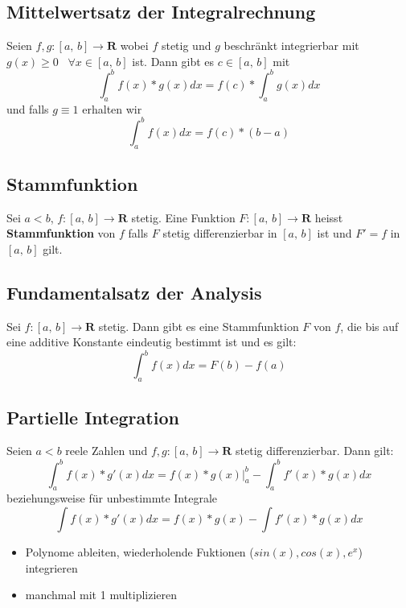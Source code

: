 \documentclass[8pt]{article}
\begin{document}
\begin{multicols*}{3}
\subsection{Mittelwertsatz der Integralrechnung}

Seien $f,g:[a,\,b] \rightarrow \mathbf{R}$ wobei $f$ stetig und $g$ beschränkt integrierbar mit $g(x) \geq 0 \;\;\; \forall x \in [a,\,b]$ ist.
Dann gibt es $c \in [a,\,b]$ mit $$\int_a^b f(x) * g(x) dx = f(c) * \int_a^b g(x) dx$$
und falls $g \equiv 1$ erhalten wir $$\int_a^b f(x) dx = f(c) * (b - a)$$

\subsection{Stammfunktion}

Sei $a < b$, $f:[a,\,b] \rightarrow \mathbf{R}$ stetig. Eine Funktion $F:[a,\,b] \rightarrow \mathbf{R}$ heisst
\textbf{Stammfunktion} von $f$ falls $F$ stetig differenzierbar in $[a,\, b]$ ist und $F' = f$ in $[a,\,b]$ gilt.

\subsection{Fundamentalsatz der Analysis}

Sei $f:[a,\,b] \rightarrow \mathbf{R}$ stetig. Dann gibt es eine Stammfunktion $F$ von $f$, die bis auf eine additive Konstante eindeutig bestimmt ist und es gilt:
$$\int_a^b f(x) dx = F(b) - f(a)$$


\subsection{Partielle Integration}

Seien $a < b$ reele Zahlen und $f,g:[a,\,b] \rightarrow \mathbf{R}$ stetig differenzierbar.
Dann gilt:
$$
  \int_a^b f(x) * g'(x) dx = f(x) * g(x) \Big|_a^b - \int_a^b f'(x) * g(x) dx
$$
beziehungsweise für unbestimmte Integrale
$$
\int f(x) * g'(x) dx = f(x) * g(x) - \int f'(x) * g(x) dx
$$

\begin{itemize}
\item Polynome ableiten, wiederholende Fuktionen ($sin(x), cos(x), e^x$) integrieren
\item manchmal mit 1 multiplizieren
\end{itemize}


\end{multicols*}
\end{document}
